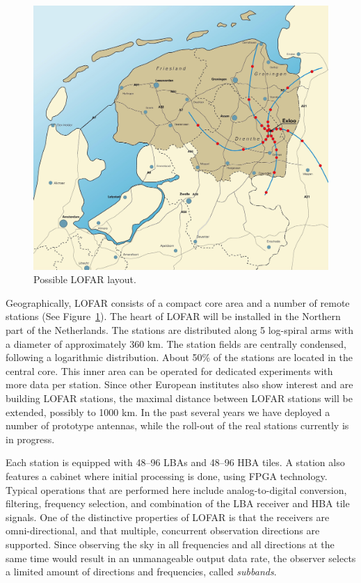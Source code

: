 \documentclass{sig-alternate}
\begin{document}
\begin{figure}[ht]
\includegraphics[width=\columnwidth]{map.jpg}
\caption{Possible LOFAR layout.}
\label{fig:map}
\end{figure}

Geographically, LOFAR consists of a compact core area and a number of
remote stations (See Figure~\ref{fig:map}).  The heart of LOFAR will be installed in the Northern
part of the Netherlands.  The stations are distributed along 5
log-spiral arms with a diameter of approximately 360 km. The station
fields are centrally condensed, following a logarithmic distribution.
About 50\% of the stations are located in the central core. This inner
area can be operated for dedicated experiments with more data per
station.  Since other European institutes also show interest and are
building LOFAR stations, the maximal distance between LOFAR stations will be
extended, possibly to 1000 km.  In the past several years we have
deployed a number of prototype antennas, while the roll-out of
the real stations currently is in progress.

Each station is equipped with 48--96 LBAs and 48--96 HBA tiles. 
A station also features a cabinet where initial processing is done, using
FPGA technology.
Typical operations that are performed here include analog-to-digital
conversion, filtering, frequency selection, and combination of the LBA
receiver and HBA tile signals.
One of the distinctive properties of LOFAR is that the receivers are
omni-directional, and that multiple, concurrent observation directions are
supported.
Since observing the sky in all frequencies and all directions at the same time
would result in an unmanageable output data rate, the observer selects a
limited amount of directions and frequencies, called \emph{subbands}.
\end{document}
